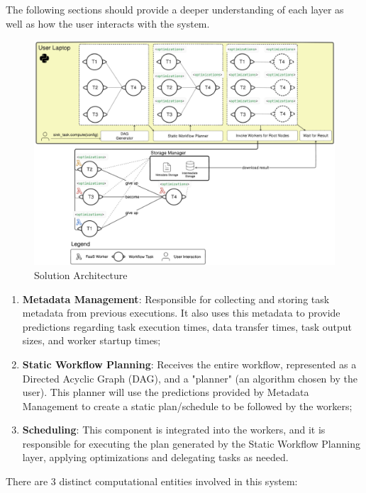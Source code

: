 \documentclass[conference]{IEEEtran}
\begin{document}
The following sections should provide a deeper understanding of each layer as well as how the user interacts with the system.

\begin{figure}[h]
  \centering
  \includegraphics[width=\columnwidth]{figures/solution_distributedarchintegrated.png}
  \caption{Solution Architecture}
  \label{fig:solution_architecture}
\end{figure}

\begin{enumerate}
    \item \textbf{Metadata Management}: Responsible for collecting and storing task metadata from previous executions. It also uses this metadata to provide predictions regarding task execution times, data transfer times, task output sizes, and worker startup times;
    \item \textbf{Static Workflow Planning}: Receives the entire workflow, represented as a Directed Acyclic Graph (DAG), and a "planner" (an algorithm chosen by the user). This planner will use the predictions provided by Metadata Management to create a static plan/schedule to be followed by the workers;
    \item \textbf{Scheduling}: This component is integrated into the workers, and it is responsible for executing the plan generated by the Static Workflow Planning layer, applying optimizations and delegating tasks as needed.
\end{enumerate}

There are 3 distinct computational entities involved in this system:
\end{document}
